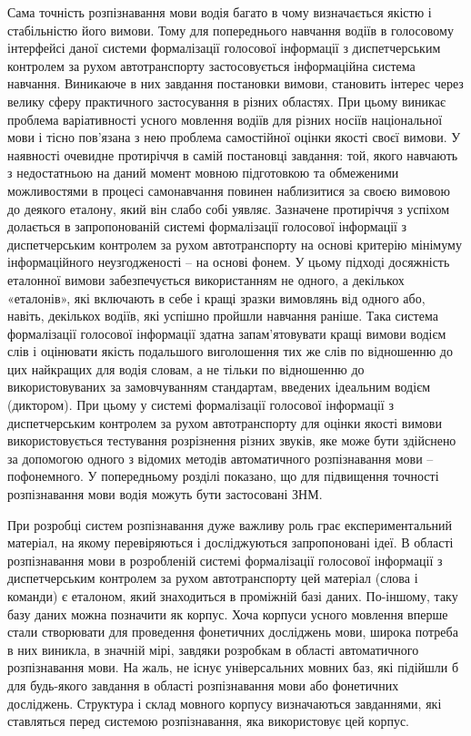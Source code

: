 Сама точність розпізнавання мови водія багато в чому визначається якістю і стабільністю його вимови. Тому для попереднього навчання водіїв в голосовому інтерфейсі даної системи формалізації голосової інформації з диспетчерським контролем за рухом автотранспорту застосовується інформаційна система навчання. Виникаюче в них завдання постановки вимови, становить інтерес через велику сферу практичного застосування в різних областях. При цьому виникає проблема варіативності усного мовлення водіїв для різних носіїв національної мови і тісно пов’язана з нею проблема самостійної оцінки якості своєї вимови. У наявності очевидне протиріччя в самій постановці завдання: той, якого навчають з недостатньою на даний момент мовною підготовкою та обмеженими можливостями в процесі самонавчання повинен наблизитися за своєю вимовою до деякого еталону, який він слабо собі уявляє. Зазначене протиріччя з успіхом долається в запропонованій системі формалізації голосової інформації з диспетчерським контролем за рухом автотранспорту на основі критерію мінімуму інформаційного неузгодженості – на основі фонем. У цьому підході досяжність еталонної вимови забезпечується використанням не одного, а декількох «еталонів», які включають в себе і кращі зразки вимовлянь від одного або, навіть, декількох водіїв, які успішно пройшли навчання раніше. Така система формалізації голосової інформації здатна запам’ятовувати кращі вимови водієм слів і оцінювати якість подальшого виголошення тих же слів по відношенню до цих найкращих для водія словам, а не тільки по відношенню до використовуваних за замовчуванням стандартам, введених ідеальним водієм (диктором). При цьому у системі формалізації голосової інформації з диспетчерським контролем за рухом автотранспорту для оцінки якості вимови використовується тестування розрізнення різних звуків, яке може бути здійснено за допомогою одного з відомих методів автоматичного розпізнавання мови – пофонемного. У попередньому розділі показано, що для підвищення точності розпізнавання мови водія можуть бути застосовані ЗНМ.

При розробці систем розпізнавання дуже важливу роль грає експериментальний матеріал, на якому перевіряються і досліджуються запропоновані ідеї. В області розпізнавання мови в розробленій системі формалізації голосової інформації з диспетчерським контролем за рухом автотранспорту цей матеріал (слова і команди) є еталоном, який знаходиться в проміжній базі даних. По-іншому, таку базу даних можна позначити як корпус. Хоча корпуси усного мовлення вперше стали створювати для проведення фонетичних досліджень мови, широка потреба в них виникла, в значній мірі, завдяки розробкам в області автоматичного розпізнавання мови. На жаль, не існує універсальних мовних баз, які підійшли б для будь-якого завдання в області розпізнавання мови або фонетичних досліджень. Структура і склад мовного корпусу визначаються завданнями, які ставляться перед системою розпізнавання, яка використовує цей корпус.

